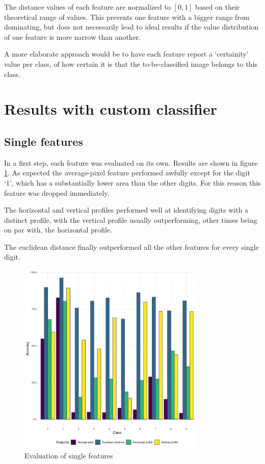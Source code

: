 \documentclass[a4paper]{scrreprt}
\begin{document}
The distance values of each feature are normalized to $[0, 1]$ based on their
theoretical range of values. This prevents one feature with a bigger range from
dominating, but does not necessarily lead to ideal results if the value
distribution of one feature is more narrow than another.

A more elaborate approach would be to have each feature report a `certainity'
value per class, of how certain it is that the to-be-classified image belongs
to this class.

\section{Results with custom classifier}

\subsection{Single features}

In a first step, each feature was evaluated on its own. Results are shown in
figure \ref{fig:evaluation_single}. As expected the average-pixel feature
performed awfully except for the digit `1', which has a substantially lower
area than the other digits. For this reason this feature was dropped
immediately.

The horizontal and vertical profiles performed well at identifying digits with
a distinct profile, with the vertical profile usually outperforming, other
times being on par with, the horizontal profile.

The euclidean distance finally outperformed all the other features for every
single digit.

\begin{figure}[h]
        \centering
		\includegraphics[width=0.8\textwidth]{../resources/features_single.png}
		\caption{Evaluation of single features}
		\label{fig:evaluation_single}
\end{figure}
\end{document}
